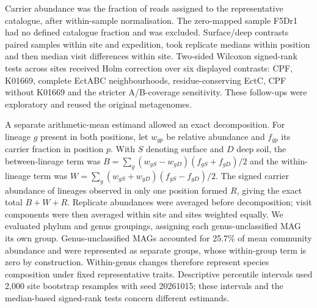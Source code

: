 Carrier abundance was the fraction of reads assigned to the representative catalogue, after within-sample normalisation. The zero-mapped sample F5Dr1 had no defined catalogue fraction and was excluded. Surface/deep contrasts paired samples within site and expedition, took replicate medians within position and then median visit differences within site. Two-sided Wilcoxon signed-rank tests across sites received Holm correction over six displayed contrasts: CPF, K01669, complete EctABC neighbourhoods, residue-conserving EctC, CPF without K01669 and the stricter A/B-coverage sensitivity. These follow-ups were exploratory and reused the original metagenomes.

A separate arithmetic-mean estimand allowed an exact decomposition. For lineage $g$ present in both positions, let $w_{gp}$ be relative abundance and $f_{gp}$ its carrier fraction in position $p$. With $S$ denoting surface and $D$ deep soil, the between-lineage term was $B=\sum_g(w_{gS}-w_{gD})(f_{gS}+f_{gD})/2$ and the within-lineage term was $W=\sum_g(w_{gS}+w_{gD})(f_{gS}-f_{gD})/2$. The signed carrier abundance of lineages observed in only one position formed $R$, giving the exact total $B+W+R$. Replicate abundances were averaged before decomposition; visit components were then averaged within site and sites weighted equally. We evaluated phylum and genus groupings, assigning each genus-unclassified MAG its own group. Genus-unclassified MAGs accounted for 25.7\% of mean community abundance and were represented as separate groups, whose within-group term is zero by construction. Within-genus changes therefore represent species composition under fixed representative traits. Descriptive percentile intervals used 2{,}000 site bootstrap resamples with seed 20261015; these intervals and the median-based signed-rank tests concern different estimands.

